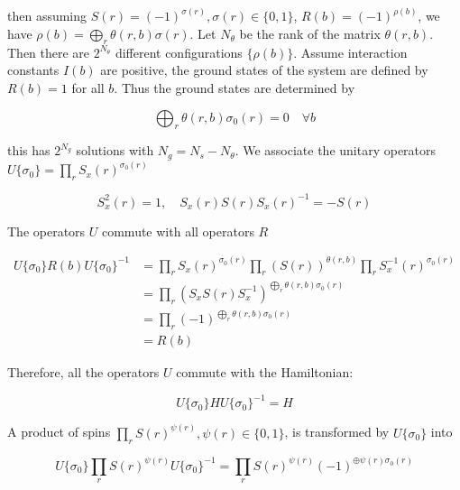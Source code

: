 \documentclass[11pt]{article}
\begin{document}
then assuming $S(r) = (-1)^{\sigma(r)},\sigma(r) \in \{0,1\}$, $R(b)=(-1)^{\rho(b)}$,
we have $\rho(b) = \bigoplus_{r}\theta(r,b)\sigma(r)$. Let $N_{\theta}$ be the rank
of the matrix $\theta(r, b)$. Then there are $2^{N_{\theta}}$ different configurations
$\{\rho(b)\}$. Assume interaction constants $I(b)$ are positive, the ground states of the system
are defined by $R(b) = 1$ for all $b$. Thus the ground states are determined by

\begin{equation}
    \bigoplus_{r}\theta(r,b)\sigma_0(r) = 0\quad \forall b
\end{equation}

this has $2^{N_g}$ solutions with $N_g = N_s - N_{\theta}$. We associate
the unitary operators $U\{\sigma_0\} = \prod_{r}S_{x}(r)^{\sigma_0(r)}$

\begin{equation}
    S_x^2(r) = 1, \quad S_x(r)S(r)S_x(r)^{-1} = -S(r)
\end{equation}

The operators $U$ commute with all operators $R$

\begin{equation}
    \begin{aligned}
        U\{\sigma_0\} R(b) U\{\sigma_0\}^{-1}
        &=\prod_{r}S_{x}(r)^{\sigma_0(r)} \prod_{r} (S(r))^{\theta(r, b)} \prod_{r}S_{x}^{-1}(r)^{\sigma_0(r)}\\
        &=\prod_{r} (S_{x}S(r)S_{x}^{-1})^{\bigoplus_{r}\theta(r, b)\sigma_0(r)}\\
        &=\prod_{r} (-1)^{\bigoplus_{r}\theta(r, b)\sigma_0(r)}\\
        &=R(b)
    \end{aligned}
\end{equation}

Therefore, all the operators $U$ commute with the Hamiltonian:

\begin{equation}
    U\{\sigma_0\} H U\{\sigma_0\}^{-1} = H
\end{equation}

A product of spins $\prod_r S(r)^{\psi(r)},\psi(r)\in\{0, 1\}$, is transformed
by $U\{\sigma_0\}$ into

\begin{equation}
    U\{\sigma_0\}\prod_{r} S(r)^{\psi(r)} U\{\sigma_0\}^{-1} = \prod_r S(r)^{\psi(r)} (-1)^{\oplus \psi(r)\sigma_0(r)}
\end{equation}
\end{document}
